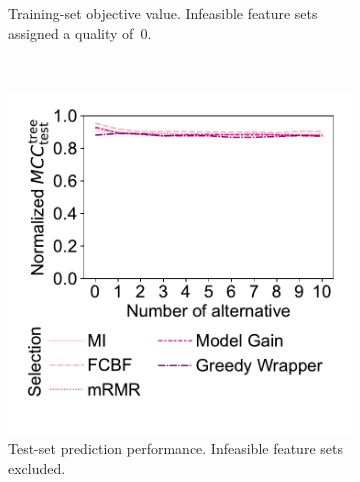 \documentclass{article}
\theoremstyle{definition}
\begin{document}
\begin{figure}[htbp]
\begin{subfigure}[t]{0.48\textwidth}
		\caption{
			Training-set objective value.
			Infeasible feature sets assigned a quality of~0.
		}
		\label{fig:afs:impact-num-alternatives-fs-method-train-objective-max-fillna}
	\end{subfigure}
	\\ \vspace{\baselineskip}
	\begin{subfigure}[t]{0.48\textwidth}
		\centering
		\includegraphics[width=\textwidth, trim=20 40 15 15, clip]{plots/afs-impact-num-alternatives-fs-method-decision-tree-test-mcc-max.pdf}
		\caption{
			Test-set prediction performance.
			Infeasible feature sets excluded.
		}
		\label{fig:afs:impact-num-alternatives-fs-method-decision-tree-test-mcc-max}
	\end{subfigure}
	\hfill
	\begin{subfigure}[t]{0.48\textwidth}
		\centering

\end{subfigure}
\end{figure}
\end{document}

